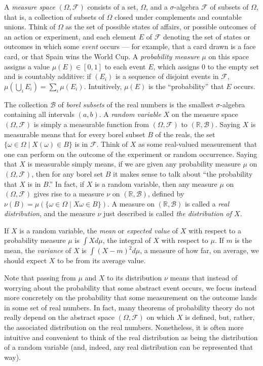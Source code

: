 \documentclass{article}
\newcommand{\RR}{\mathbb{R}}
\newcommand{\st}{ \; | \;}
\newcommand{\mdl}[1]{{\mathcal #1}}
\begin{document}
A \emph{measure space} $(\Omega, \mdl F)$ consists of a set, $\Omega$, and a $\sigma$-algebra $\mdl F$ of subsets of $\Omega$, that is, a collection of subsets of $\Omega$ closed under complements and countable unions. Think of $\Omega$ as the set of possible states of affairs, or possible outcomes of an action or experiment, and each element $E$ of $\mdl F$ denoting the set of states or outcomes in which some \emph{event} occurs --- for example, that a card drawn is a face card, or that Spain wins the World Cup. A \emph{probability measure} $\mu$ on this space assigns a value $\mu(E) \in [0, 1]$ to each event $E$, which assigns $0$ to the empty set and is countably additive: if $(E_i)$ is a sequence of disjoint events in $\mdl F$, $\mu(\bigcup_i E_i) = \sum_i \mu(E_i)$. Intuitively, $\mu(E)$ is the ``probability'' that $E$ occurs. 

The collection $\mdl B$ of \emph{borel subsets} of the real numbers is the smallest $\sigma$-algebra containing all intervals $(a, b)$. A \emph{random variable} $X$ on the measure space $(\Omega, \mdl F)$ is simply a measurable function from $(\Omega, \mdl F)$ to $(\RR, \mdl B)$. Saying $X$ is measurable means that for every borel subset $B$ of the reals, the set $\{ \omega \in \Omega \st X(\omega) \in B \}$ is in $\mdl F$. Think of $X$ as some real-valued measurement that one can perform on the outcome of the experiment or random occurrence. Saying that $X$ is measurable simply means, if we are given any probability measure $\mu$ on $(\Omega, \mdl F)$, then for any borel set $B$ it makes sense to talk about ``the probability that $X$ is in $B$.'' In fact, if $X$ is a random variable, then any measure $\mu$ on $(\Omega, \mdl F)$ gives rise to a measure $\nu$ on $(\RR, \mdl B)$, defined by $\nu(B) = \mu ( \{ \omega \in \Omega \st X \omega \in B \})$. A measure on $(\RR, \mdl B)$ is called a \emph{real distribution}, and the measure $\nu$ just described is called \emph{the distribution of $X$}.

If $X$ is a random variable, the \emph{mean} or \emph{expected value} of $X$ with respect to a probability measure $\mu$ is $\int X d\mu$, the integral of $X$ with respect to $\mu$. If $m$ is the mean, the \emph{variance} of $X$ is $\int (X - m)^2 d\mu$, a measure of how far, on average, we should expect $X$ to be from its average value.

Note that passing from $\mu$ and $X$ to its distribution $\nu$ means that instead of worrying about the probability that some abstract event occurs, we focus instead more concretely on the probability that some measurement on the outcome lands in some set of real numbers. In fact, many theorems of probability theory do not really depend on the abstract space $(\Omega, \mdl F)$ on which $X$ is defined, but, rather, the associated distribution on the real numbers. Nonetheless, it is often more intuitive and convenient to think of the real distribution as being the distribution of a random variable (and, indeed, any real distribution can be represented that way). 
\end{document}
